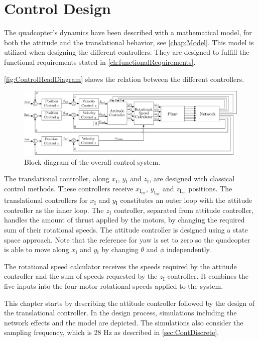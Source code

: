 \chapter{Control Design}\label{chap:Control}
The quadcopter's dynamics have been described with a mathematical model, for both the attitude and the translational behavior, see \autoref{chap:Model}. This model is utilized when designing the different controllers. They are designed to fulfill the functional requirements stated in \autoref{ch:functionalRequirements}.

\autoref{fig:ControlHeadDiagram} shows the relation between the different controllers.

\begin{figure}[H]
	\centering
	\includegraphics[width=1 \textwidth]{figures/ControlDiagramPoster}
	\caption{Block diagram of the overall control system. }
	\label{fig:ControlHeadDiagram}
\end{figure}
%
The translational controller, along $x_{\mathrm{I}}$, $y\mathrm{_I}$ and $z\mathrm{_I}$, are designed with classical control methods. These controllers receive $x_\mathrm{I_{ref}}$, $y_\mathrm{I_{ref}}$ and $z_\mathrm{I_{ref}}$ positions. The translational controllers for $x\mathrm{_I}$ and $y\mathrm{_I}$ constitutes an outer loop with the attitude controller as the inner loop. The $z\mathrm{_I}$ controller, separated from attitude controller, handles the amount of thrust applied by the motors, by changing the required sum of their rotational speeds. The attitude controller is designed using a state space approach. Note that the reference for yaw is set to zero so the quadcopter is able to move along $x_{\mathrm{I}}$ and $y\mathrm{_I}$ by changing $\theta$ and $\phi$ independently.

The rotational speed calculator receives the speeds required by the attitude controller and the sum of speeds requested by the $z\mathrm{_I}$ controller. It combines the five inputs into the four motor rotational speeds applied to the system.


This chapter starts by describing the attitude controller followed by the design of the translational controller. In the design process, simulations including the network effects and the model are depicted. The simulations also consider the sampling frequency, which is 28 Hz as described in \autoref{sec:ContDiscrete}.